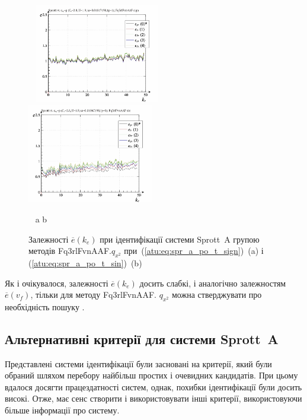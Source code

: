 \begin{figure}[htb!]
\begin{center}
  ~ \hfill
    \includegraphics[width=0.49\textwidth]{p/cha/spr_a/Fq3rlFvnAAF_x2/sprott_a_id-p_k_e_sign.png}
    \hfill
    \includegraphics[width=0.49\textwidth]{p/cha/spr_a/Fq3rlFvnAAF_x2/sprott_a_id-p_k_e_sin.png}
  \hfill ~
\end{center}
  \vspace{-1.0ex}
  \begin{center}
    ~ \hfill a \hfill\hfill b \hfill ~
  \end{center}
  \caption{Залежності $\overline{e} (k_e)$ при ідентифікації системи Sprott~A групою методів Fq3rlFvnAAF.$q_{x^2}$ при~(\ref{atu:eq:spr_a_po_t_sign})~(a) і (\ref{atu:eq:spr_a_po_t_sin})~(b)}
  \label{atu:f:spr_a_k_e_Fq3rlFvnAAF_q_x2}
\end{figure}

Як і очікувалося, залежності
$\overline{e} (k_e)$ досить слабкі, і аналогічно залежностям
$\overline{e} (v_f)$, тільки для методу Fq3rlFvnAAF.
$q_{x^2}$ можна стверджувати про необхідність пошуку .


\subsection{Альтернативні критерії для системи Sprott~A}%

Представлені системи ідентифікації були засновані на критерії,
який були обраний шляхом перебору найбільш простих і очевидних
кандидатів. При цьому вдалося досягти працездатності систем,
однак, похибки ідентифікації були досить високі. Отже, має
сенс створити і використовувати інші критерії, використовуючи
більше інформації про систему.

